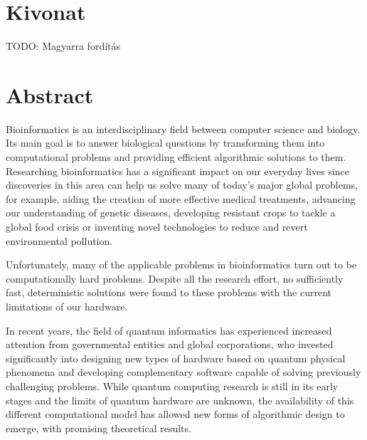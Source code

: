 \setcounter{page}{1}

\selecthungarian

\chapter*{Kivonat}

TODO: Magyarra fordítás


\vfill
\selectenglish


\chapter*{Abstract}

Bioinformatics is an interdisciplinary field between computer science and biology. Its main goal is to answer biological questions by transforming them into computational problems and providing efficient algorithmic solutions to them. Researching bioinformatics has a significant impact on our everyday lives since discoveries in this area can help us solve many of today's major global problems, for example, aiding the creation of more effective medical treatments, advancing our understanding of genetic diseases, developing resistant crops to tackle a global food crisis or inventing novel technologies to reduce and revert environmental pollution.

Unfortunately, many of the applicable problems in bioinformatics turn out to be computationally hard problems. Despite all the research effort, no sufficiently fast, deterministic solutions were found to these problems with the current limitations of our hardware.

In recent years, the field of quantum informatics has experienced increased attention from governmental entities and global corporations, who invested significantly into designing new types of hardware based on quantum physical phenomena and developing complementary software capable of solving previously challenging problems. While quantum computing research is still in its early stages and the limits of quantum hardware are unknown, the availability of this different computational model has allowed new forms of algorithmic design to emerge, with promising theoretical results.

\vfill
\selectthesislanguage

\setcounter{romanPage}{\value{page}}
